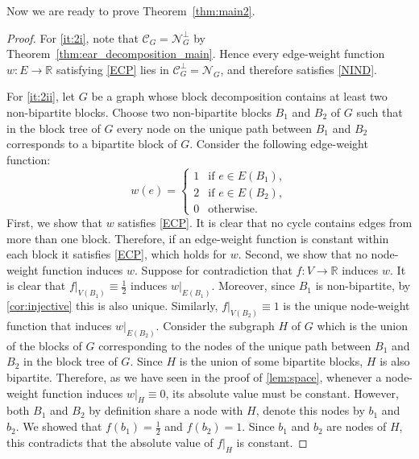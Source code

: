 \documentclass{article}
\theoremstyle{plain}
\theoremstyle{definition}
\begin{document}
Now we are ready to prove Theorem~\ref{thm:main2}.

\thmmainsecond*
\begin{proof}
    For \ref{it:2i}, note that $\mathcal{C}_G = \mathcal{N}_G^{\perp}$ by Theorem~\ref{thm:ear_decomposition_main}. Hence every edge-weight function $w \colon E \to \mathbb{R}$ satisfying \ref{ECP} lies in $\mathcal{C}_G^\bot = \mathcal{N}_G$, and therefore satisfies \ref{NIND}.

    For \ref{it:2ii}, let $G$ be a graph whose block decomposition contains at least two non-bipartite blocks. Choose two non-bipartite blocks $B_{1}$ and $B_{2}$ of $G$ such that in the block tree of $G$ every node on the unique path between $B_{1}$ and $B_{2}$ corresponds to a bipartite block of $G$. Consider the following edge-weight function:
    \[
        w(e) =
        \begin{cases}
            1 & \text{if } e \in E(B_{1}),\\
            2 & \text{if } e \in E(B_{2}),\\
            0 & \text{otherwise}.
        \end{cases}
    \]
    First, we show that $w$ satisfies \ref{ECP}. It is clear that no cycle contains edges from more than one block. Therefore, if an edge-weight function is constant within each block it satisfies \ref{ECP}, which holds for $w$. 
    Second, we show that no node-weight function induces $w$. Suppose for contradiction that $f\colon V \rightarrow \mathbb{R}$ induces $w$. It is clear that ${f|_{V(B_{1})}} \equiv \frac{1}{2}$ induces $w|_{E(B_{1})}$. Moreover, since $B_{1}$ is non-bipartite, by \cref{cor:injective} this is also unique. Similarly, ${f|_{V(B_{2})}} \equiv 1$ is the unique node-weight function that induces $w|_{E(B_{2})}$. Consider the subgraph $H$ of $G$ which is the union of the blocks of $G$ corresponding to the nodes of the unique path between $B_{1}$ and $B_{2}$ in the block tree of $G$. Since $H$ is the union of some bipartite blocks, $H$ is also bipartite. Therefore, as we have seen in the proof of \cref{lem:space}, whenever a node-weight function induces ${w|_H} \equiv 0$, its absolute value must be constant. However, both $B_{1}$ and $B_{2}$ by definition share a node with $H$, denote this nodes by $b_{1}$ and $b_{2}$. We showed that $f(b_{1}) = \frac{1}{2}$ and $f(b_{2}) = 1$. Since $b_{1}$ and $b_{2}$ are nodes of $H$, this contradicts that the absolute value of $f|_H$ is constant.
\end{proof}
\end{document}
